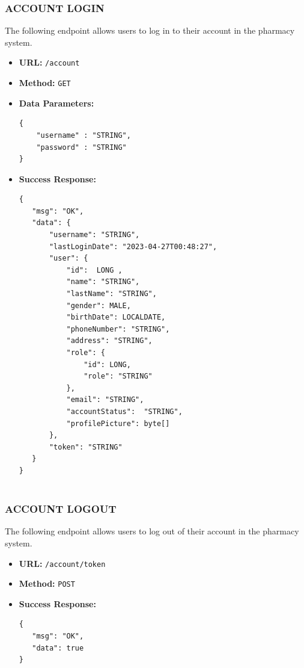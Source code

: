 \subsubsection*{ACCOUNT LOGIN}
The following endpoint allows users to log in to their account in the pharmacy system.
\begin{itemize}
    \item \textbf{URL:}
    \newline \hspace*{1cm} \texttt{/account}  
    \item \textbf{Method:}
    \newline \hspace*{1cm}\texttt{GET}
    \item \textbf{Data Parameters:}
\begin{lstlisting}[breaklines]
{
    "username" : "STRING",
    "password" : "STRING"
}

\end{lstlisting}
    \item \textbf{Success Response:}
\begin{lstlisting}[breaklines]
{
   "msg": "OK",
   "data": {
       "username": "STRING",
       "lastLoginDate": "2023-04-27T00:48:27",
       "user": {
           "id":  LONG ,
           "name": "STRING",
           "lastName": "STRING",
           "gender": MALE,
           "birthDate": LOCALDATE,
           "phoneNumber": "STRING",
           "address": "STRING",
           "role": {
               "id": LONG,
               "role": "STRING"
           },
           "email": "STRING",
           "accountStatus":  "STRING",
           "profilePicture": byte[]
       },
       "token": "STRING"
   }
}


\end{lstlisting}
\end{itemize}

\subsubsection*{ACCOUNT LOGOUT}
The following endpoint allows users to log out of their account in the pharmacy system. 
\begin{itemize}
    \item \textbf{URL:}
    \newline \hspace*{1cm} \texttt{/account/{token}}  
    \item \textbf{Method:}
    \newline \hspace*{1cm}\texttt{POST}
    \item \textbf{Success Response:}
\begin{lstlisting}[breaklines]
{
   "msg": "OK",
   "data": true
}

\end{lstlisting}
\end{itemize}